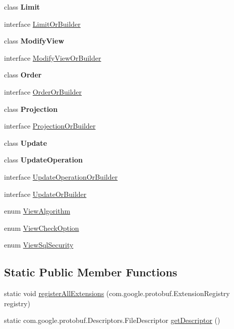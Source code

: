 \begin{DoxyCompactItemize}
\item 
class {\bfseries Limit}
\item 
interface \mbox{\hyperlink{interfacecom_1_1mysql_1_1cj_1_1x_1_1protobuf_1_1_mysqlx_crud_1_1_limit_or_builder}{Limit\+Or\+Builder}}
\item 
class {\bfseries Modify\+View}
\item 
interface \mbox{\hyperlink{interfacecom_1_1mysql_1_1cj_1_1x_1_1protobuf_1_1_mysqlx_crud_1_1_modify_view_or_builder}{Modify\+View\+Or\+Builder}}
\item 
class {\bfseries Order}
\item 
interface \mbox{\hyperlink{interfacecom_1_1mysql_1_1cj_1_1x_1_1protobuf_1_1_mysqlx_crud_1_1_order_or_builder}{Order\+Or\+Builder}}
\item 
class {\bfseries Projection}
\item 
interface \mbox{\hyperlink{interfacecom_1_1mysql_1_1cj_1_1x_1_1protobuf_1_1_mysqlx_crud_1_1_projection_or_builder}{Projection\+Or\+Builder}}
\item 
class {\bfseries Update}
\item 
class {\bfseries Update\+Operation}
\item 
interface \mbox{\hyperlink{interfacecom_1_1mysql_1_1cj_1_1x_1_1protobuf_1_1_mysqlx_crud_1_1_update_operation_or_builder}{Update\+Operation\+Or\+Builder}}
\item 
interface \mbox{\hyperlink{interfacecom_1_1mysql_1_1cj_1_1x_1_1protobuf_1_1_mysqlx_crud_1_1_update_or_builder}{Update\+Or\+Builder}}
\item 
enum \mbox{\hyperlink{enumcom_1_1mysql_1_1cj_1_1x_1_1protobuf_1_1_mysqlx_crud_1_1_view_algorithm}{View\+Algorithm}}
\item 
enum \mbox{\hyperlink{enumcom_1_1mysql_1_1cj_1_1x_1_1protobuf_1_1_mysqlx_crud_1_1_view_check_option}{View\+Check\+Option}}
\item 
enum \mbox{\hyperlink{enumcom_1_1mysql_1_1cj_1_1x_1_1protobuf_1_1_mysqlx_crud_1_1_view_sql_security}{View\+Sql\+Security}}
\end{DoxyCompactItemize}
\subsection*{Static Public Member Functions}
\begin{DoxyCompactItemize}
\item 
static void \mbox{\hyperlink{classcom_1_1mysql_1_1cj_1_1x_1_1protobuf_1_1_mysqlx_crud_a2927ce119a78def2e1356307be256996}{register\+All\+Extensions}} (com.\+google.\+protobuf.\+Extension\+Registry registry)
\item 
static com.\+google.\+protobuf.\+Descriptors.\+File\+Descriptor \mbox{\hyperlink{classcom_1_1mysql_1_1cj_1_1x_1_1protobuf_1_1_mysqlx_crud_a3ae25aea11ecd8e5cf721fd281021f10}{get\+Descriptor}} ()
\end{DoxyCompactItemize}


